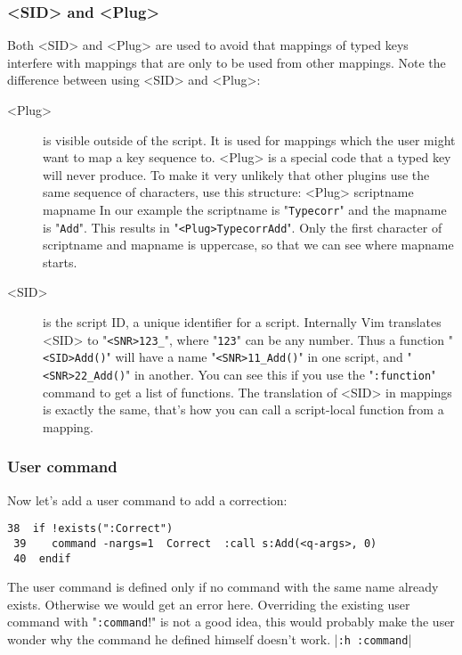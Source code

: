 \subsubsection{<SID> and <Plug>}
\label{using-<Plug>}
Both <SID> and <Plug> are used to avoid that mappings of typed keys interfere with mappings that are only to be used from other mappings.
Note the difference between using <SID> and <Plug>:

\begin{description}
				\item [<Plug>]    is visible outside of the script.
								It is used for mappings which the user might want to map a key sequence to.
								<Plug> is a special code that a typed key will never produce.
								To make it very unlikely that other plugins use the same sequence of characters, use this structure: <Plug> scriptname mapname In our example the scriptname is "\verb!Typecorr!" and the mapname is "\verb!Add!".
								This results in "\verb!<Plug>TypecorrAdd!".
								Only the first character of scriptname and mapname is uppercase, so that we can see where mapname starts.

				\item [<SID>]  is the script ID, a unique identifier for a script.
								Internally Vim translates <SID> to "\verb!<SNR>123_!", where "\verb!123!" can be any number.
								Thus a function "\verb!<SID>Add()!" will have a name "\verb!<SNR>11_Add()!" in one script, and "\verb!<SNR>22_Add()!" in another.
								You can see this if you use the "\verb!:function!" command to get a list of functions.
								The translation of <SID> in mappings is exactly the same, that's how you can call a script-local function from a mapping.
\end{description}


\subsubsection{User command}
Now let's add a user command to add a correction:

\begin{Verbatim}[samepage=true]
 38  if !exists(":Correct")
 39    command -nargs=1  Correct  :call s:Add(<q-args>, 0)
 40  endif
\end{Verbatim}

The user command is defined only if no command with the same name already exists.
Otherwise we would get an error here.
Overriding the existing user command with "\verb!:command!!" is not a good idea, this would probably make the user wonder why the command he defined himself doesn't work.
|\verb!:h :command!|

